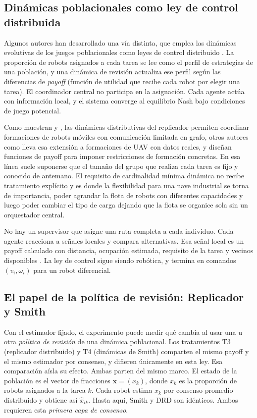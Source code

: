 \subsection{Dinámicas poblacionales como ley de control distribuida}

Algunos autores han desarrollado una vía distinta, que emplea las dinámicas evolutivas de
los juegos poblacionales como leyes de control distribuido \citep{quijano2017population}. La proporción de robots asignados a cada tarea se lee como el perfil de estrategias de
una población, y una dinámica de revisión actualiza ese perfil según las diferencias de
\emph{payoff} (función de utilidad que recibe cada robot por elegir una tarea). El
coordinador central no participa en la asignación. Cada agente actúa con información
local, y el sistema converge al equilibrio Nash bajo condiciones de juego potencial.

Como muestran \citet{barreiro2017distributed} y \citet{martinez2020formation}, las
dinámicas distributivas del replicador permiten coordinar formaciones de robots móviles
con comunicación limitada en grafo, otros autores como \citet{barreiro2021uav} lleva esa extensión a
formaciones de UAV con datos reales, y \citet{dinh2026bsplines} diseñan funciones de
payoff para imponer restricciones de formación concretas. En esa línea
suele suponerse que el tamaño del grupo que realiza cada tarea es fijo y conocido de antemano. El requisito
de cardinalidad mínima dinámica no recibe tratamiento explícito y es donde la flexibilidad para una nave industrial se torna de importancia, poder agrandar la flota de robots con diferentes capacidades y luego poder cambiar el tipo de carga dejando que la flota se organice sola sin un orquestador central.

No hay un supervisor que asigne una ruta completa a cada individuo. Cada agente reacciona a señales locales y
compara alternativas. Esa señal local es un payoff calculado con distancia,
ocupación estimada, requisito de la tarea y vecinos disponibles
\citep{theraulaz1999stigmergy}. La ley de control sigue siendo robótica, y termina en
comandos $(v_i,\omega_i)$ para un robot diferencial.

\subsection{El papel de la política de revisión: Replicador y Smith}
\label{subsec:porquesmith}

Con el estimador fijado, el experimento puede medir qué cambia al usar una u otra
\emph{política de revisión} de una dinámica poblacional. Los tratamientos T3
(replicador distribuido) y T4 (dinámicas de Smith) comparten el mismo payoff y el mismo
estimador por consenso, y difieren únicamente en esta ley. Esa comparación aísla su
efecto. Ambas parten del mismo marco. El estado de la población es el vector de fracciones
$\mathbf{x} = (x_k)$, donde $x_k$ es la proporción de robots asignados a la tarea $k$.
Cada robot estima $x_k$ por consenso promedio distribuido y obtiene así
$\hat{x}_{ik}$. Hasta aquí, Smith y DRD son idénticos. Ambos requieren esta
\emph{primera capa de consenso}.

